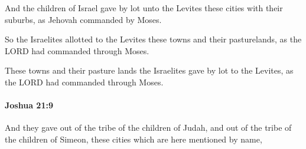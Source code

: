 			\begin{versebox}
					\item[BHS] 
					\item[ASV] And the children of Israel gave by lot unto the Levites these cities with their suburbs, as Jehovah commanded by Moses.
					\item[NIV] So the Israelites allotted to the Levites these towns and their pasturelands, as the LORD had commanded through Moses.
					\item[NRSV] These towns and their pasture lands the Israelites gave by lot to the Levites, as the LORD had commanded through Moses.
			\end{versebox}

		\paragraph{Joshua 21:9} %
			\label{JOSHUA-21-9}

			And they gave out of the tribe of the children of Judah, and out of the tribe of the children of Simeon, these cities which are here mentioned by name,

